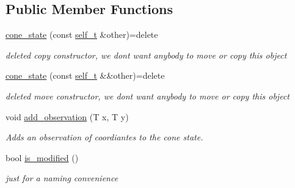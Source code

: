 \subsection*{Public Member Functions}
\begin{DoxyCompactItemize}
\item 
\mbox{\label{classclara_1_1cone__state_ae8c7feebfc46bd183d93db3245c43a3d}} 
\hyperlink{classclara_1_1cone__state_ae8c7feebfc46bd183d93db3245c43a3d}{cone\+\_\+state} (const \hyperlink{classclara_1_1cone__state_a74ce83ddac5e4056fd4bb1e7d217f9f8}{self\+\_\+t} \&other)=delete
\begin{DoxyCompactList}\small\item\em deleted copy constructor, we don\textquotesingle{}t want anybody to move or copy this object \end{DoxyCompactList}\item 
\mbox{\label{classclara_1_1cone__state_ad70f9d4e537af05a549853f276813ce6}} 
\hyperlink{classclara_1_1cone__state_ad70f9d4e537af05a549853f276813ce6}{cone\+\_\+state} (const \hyperlink{classclara_1_1cone__state_a74ce83ddac5e4056fd4bb1e7d217f9f8}{self\+\_\+t} \&\&other)=delete
\begin{DoxyCompactList}\small\item\em deleted move constructor, we don\textquotesingle{}t want anybody to move or copy this object \end{DoxyCompactList}\item 
void \hyperlink{classclara_1_1cone__state_a7cd7364ca787c25b0ca333d0cb1c3081}{add\+\_\+observation} (T x, T y)
\begin{DoxyCompactList}\small\item\em Adds an observation of coordiantes to the cone state. \end{DoxyCompactList}\item 
\mbox{\label{classclara_1_1cone__state_ae8642cde249796203a906df935e35f39}} 
bool \hyperlink{classclara_1_1cone__state_ae8642cde249796203a906df935e35f39}{is\+\_\+modified} ()
\begin{DoxyCompactList}\small\item\em just for a naming convenience \end{DoxyCompactList}\item 
\mbox{\label{classclara_1_1cone__state_a8cb6454f6a731f69d3e85382b0ae40b4}} 

\end{DoxyCompactItemize}
